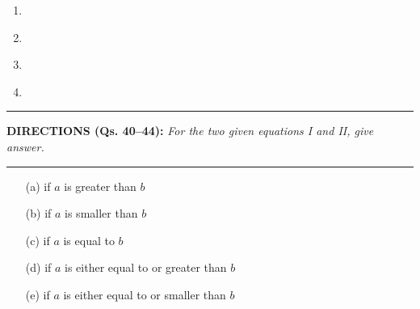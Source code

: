 \begin{multicols}{2}
\begin{enumerate}[leftmargin=*]
\item 
\begin{itemize}
\end{itemize}

\item 
\begin{itemize}
\end{itemize}

\item 
\begin{itemize}
\end{itemize}

\item 
\begin{itemize}
\end{itemize}
\end{enumerate}

\noindent
\rule{\columnwidth}{1pt}

\noindent
{\sf\bfseries DIRECTIONS (Qs. 40--44):} {\it For the two given equations I and II, give answer.}

\noindent
\rule{\columnwidth}{1pt}

\begin{itemize}
\item[(a)] if $a$ is greater than $b$
\item[(b)] if $a$ is smaller than $b$
\item[(c)] if $a$ is equal to $b$
\item[(d)] if $a$ is either equal to or greater than $b$
\item[(e)] if $a$ is either equal to or smaller than $b$
\end{itemize}


\end{multicols}
